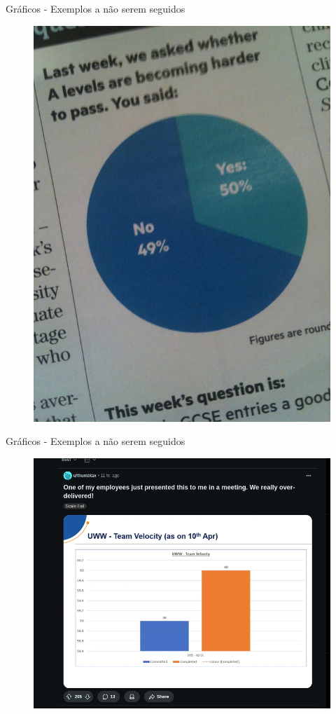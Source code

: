 \begin{frame}{Gráficos - Exemplos a não serem seguidos}
    \begin{figure}
        \centering
        \includegraphics[width=0.5\linewidth]{figures/lie_5.jpg}
    \end{figure}
\end{frame}

\begin{frame}{Gráficos - Exemplos a não serem seguidos}
    \begin{figure}
        \centering
        \includegraphics[width=0.8\linewidth]{figures/lie_6.png}
    \end{figure}
\end{frame}


